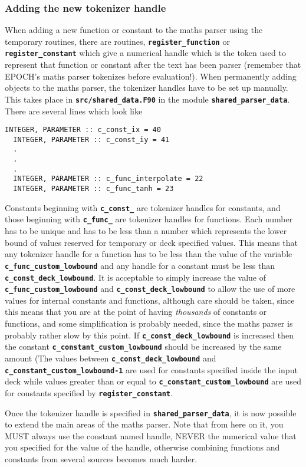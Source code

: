 \documentclass[12pt,a4paper]{article}
\newcommand{\simpleboxverbatim}{\begin{Verbatim}[obeytabs=true,frame=single,
  framerule=0.5mm,rulecolor=\color{warwickmid},formatcom=\color{black}]}
\newcommand{\inlinecode}[1]{{\color{warwickred} \bf\texttt{#1}}}
\begin{document}
\subsubsection{Adding the new tokenizer handle}
When adding a new function or constant to the maths parser using the temporary
routines, there are routines, \inlinecode{register\_function} or
\inlinecode{register\_constant} which give a numerical handle which is the token
used to represent that function or constant after the text has been parser
(remember that EPOCH's maths parser tokenizes before evaluation!). When
permanently adding objects to the maths parser, the tokenizer handles have to
be set up manually. This takes place in \inlinecode{src/shared\_data.F90} in
the module \inlinecode{shared\_parser\_data}. There are several lines which
look like
\simpleboxverbatim
  INTEGER, PARAMETER :: c_const_ix = 40
  INTEGER, PARAMETER :: c_const_iy = 41
  .
  .
  .
  INTEGER, PARAMETER :: c_func_interpolate = 22
  INTEGER, PARAMETER :: c_func_tanh = 23
\end{Verbatim}
Constants beginning with \inlinecode{c\_const\_} are tokenizer handles for
constants, and those beginning with \inlinecode{c\_func\_} are tokenizer handles
for functions. Each number has to be unique and has to be less than a number
which represents the lower bound of values reserved for temporary or deck
specified values. This means that any tokenizer handle for a function has to be
less than the value of the variable \inlinecode{c\_func\_custom\_lowbound} and any
handle for a constant must be less than \inlinecode{c\_const\_deck\_lowbound}. It
is acceptable to simply increase the value of
\inlinecode{c\_func\_custom\_lowbound} and \inlinecode{c\_const\_deck\_lowbound} to
allow the use of more values for internal constants and functions, although
care should be taken, since this means that you are at the point of having {\it
thousands} of constants or functions, and some simplification is probably
needed, since the maths parser is probably rather slow by this point. If
\inlinecode{c\_const\_deck\_lowbound} is increased then the constant
\inlinecode{c\_constant\_custom\_lowbound} should be increased by the same amount
(The values between \inlinecode{c\_const\_deck\_lowbound} and
\inlinecode{c\_constant\_custom\_lowbound-1} are used for constants specified
inside the input deck while values greater than or equal to
\inlinecode{c\_constant\_custom\_lowbound} are used for constants specified by
\inlinecode{register\_constant}.

Once the tokenizer handle is specified in \inlinecode{shared\_parser\_data}, it
is now possible to extend the main areas of the maths parser. Note that from
here on it, you MUST always use the constant named handle, NEVER the numerical
value that you specified for the value of the handle, otherwise combining
functions and constants from several sources becomes much harder.
\end{document}
